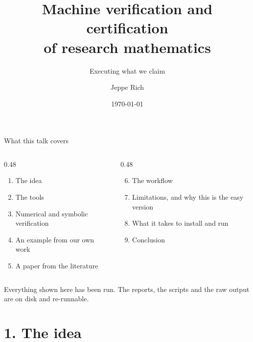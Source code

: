\documentclass[aspectratio=169,11pt]{beamer}
\title{\bfseries Machine verification and certification\\of research mathematics}
\subtitle{Executing what we claim}
\author{Jeppe Rich}
\institute{DTU Management}
\date{\today}
\begin{document}
\begin{frame}[plain]
  \titlepage
\end{frame}

\begin{frame}{What this talk covers}
  \begin{columns}[T]
    \begin{column}{0.48\textwidth}
      \begin{enumerate}
        \item The idea
        \item The tools
        \item Numerical and symbolic verification
        \item An example from our own work
        \item A paper from the literature
      \end{enumerate}
    \end{column}
    \begin{column}{0.48\textwidth}
      \begin{enumerate}
        \setcounter{enumi}{5}
        \item The workflow
        \item Limitations, and why this is the easy version
        \item What it takes to install and run
        \item Conclusion
      \end{enumerate}
    \end{column}
  \end{columns}
  \vfill
  {\color{slate}\small Everything shown here has been run. The reports, the scripts and the raw
  output are on disk and re-runnable.}
\end{frame}

\section{1. The idea}
\begin{frame}[plain]
  \vfill{}\vfill
\end{frame}
\end{document}
